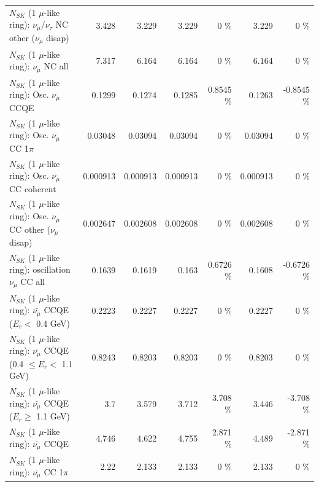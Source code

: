 \begin{table}
\begin{tabular}{| l | r | r | r  r | r  r |}
   $N_{SK}$ (1 $\mu$-like ring): $\nu_\mu$/$\nu_\tau$ NC other ($\nu_\mu$ disap) &           3.428 &           3.229 &           3.229 &        0 \%  &           3.229 &        0 \%  \\ 
                                $N_{SK}$ (1 $\mu$-like ring): $\nu_{\mu}$ NC all &           7.317 &           6.164 &           6.164 &        0 \%  &           6.164 &        0 \%  \\ 
\hline
\hline
                               $N_{SK}$ (1 $\mu$-like ring): Osc. $\nu_\mu$ CCQE &          0.1299 &          0.1274 &          0.1285 &   0.8545 \%  &          0.1263 &  -0.8545 \%  \\ 
                          $N_{SK}$ (1 $\mu$-like ring): Osc. $\nu_\mu$ CC 1$\pi$ &         0.03048 &         0.03094 &         0.03094 &        0 \%  &         0.03094 &        0 \%  \\ 
                        $N_{SK}$ (1 $\mu$-like ring): Osc. $\nu_\mu$ CC coherent &        0.000913 &        0.000913 &        0.000913 &        0 \%  &        0.000913 &        0 \%  \\ 
         $N_{SK}$ (1 $\mu$-like ring): Osc. $\nu_\mu$ CC other ($\nu_\mu$ disap) &        0.002647 &        0.002608 &        0.002608 &        0 \%  &        0.002608 &        0 \%  \\ 
                      $N_{SK}$ (1 $\mu$-like ring): oscillation $\nu_\mu$ CC all &          0.1639 &          0.1619 &           0.163 &   0.6726 \%  &          0.1608 &  -0.6726 \%  \\ 
\hline
\hline
          $N_{SK}$ (1 $\mu$-like ring): $\bar{\nu_\mu}$ CCQE ($E_{r} <$ 0.4 GeV) &          0.2223 &          0.2227 &          0.2227 &        0 \%  &          0.2227 &        0 \%  \\ 
 $N_{SK}$ (1 $\mu$-like ring): $\bar{\nu_\mu}$ CCQE (0.4 $\leq E_{r} <$ 1.1 GeV) &          0.8243 &          0.8203 &          0.8203 &        0 \%  &          0.8203 &        0 \%  \\ 
       $N_{SK}$ (1 $\mu$-like ring): $\bar{\nu_\mu}$ CCQE ($E_{r} \geq$ 1.1 GeV) &             3.7 &           3.579 &           3.712 &    3.708 \%  &           3.446 &   -3.708 \%  \\ 
\hline
                              $N_{SK}$ (1 $\mu$-like ring): $\bar{\nu_\mu}$ CCQE &           4.746 &           4.622 &           4.755 &    2.871 \%  &           4.489 &   -2.871 \%  \\ 
                         $N_{SK}$ (1 $\mu$-like ring): $\bar{\nu_\mu}$ CC 1$\pi$ &            2.22 &           2.133 &           2.133 &        0 \%  &           2.133 &        0 \%  \\ 

\end{tabular}
\end{table}
